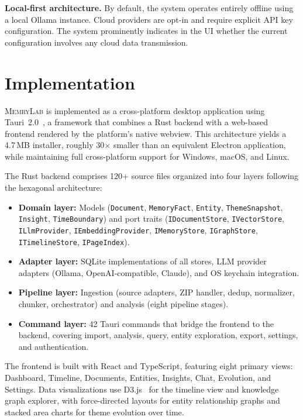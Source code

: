 \documentclass[manuscript,review]{acmart}
\begin{document}
\textbf{Local-first architecture.}
By default, the system operates entirely offline using a local Ollama instance.
Cloud providers are opt-in and require explicit API key configuration.
The system prominently indicates in the UI whether the current configuration involves any cloud data transmission.


\section{Implementation}
\label{sec:implementation}

\textsc{MemryLab} is implemented as a cross-platform desktop application using Tauri~2.0~\cite{nickolls2024tauri}, a framework that combines a Rust backend with a web-based frontend rendered by the platform's native webview.
This architecture yields a 4.7\,MB installer, roughly 30$\times$ smaller than an equivalent Electron application, while maintaining full cross-platform support for Windows, macOS, and Linux.

The Rust backend comprises 120+ source files organized into four layers following the hexagonal architecture:

\begin{itemize}
    \item \textbf{Domain layer:} Models (\texttt{Document}, \texttt{MemoryFact}, \texttt{Entity}, \texttt{ThemeSnapshot}, \texttt{Insight}, \texttt{TimeBoundary}) and port traits (\texttt{IDocumentStore}, \texttt{IVectorStore}, \texttt{ILlmProvider}, \texttt{IEmbeddingProvider}, \texttt{IMemoryStore}, \texttt{IGraphStore}, \texttt{ITimelineStore}, \texttt{IPageIndex}).
    \item \textbf{Adapter layer:} SQLite implementations of all stores, LLM provider adapters (Ollama, OpenAI-compatible, Claude), and OS keychain integration.
    \item \textbf{Pipeline layer:} Ingestion (source adapters, ZIP handler, dedup, normalizer, chunker, orchestrator) and analysis (eight pipeline stages).
    \item \textbf{Command layer:} 42 Tauri commands that bridge the frontend to the backend, covering import, analysis, query, entity exploration, export, settings, and authentication.
\end{itemize}

The frontend is built with React and TypeScript, featuring eight primary views: Dashboard, Timeline, Documents, Entities, Insights, Chat, Evolution, and Settings.
Data visualizations use D3.js~\cite{bostock2011d3} for the timeline view and knowledge graph explorer, with force-directed layouts for entity relationship graphs and stacked area charts for theme evolution over time.
\end{document}
